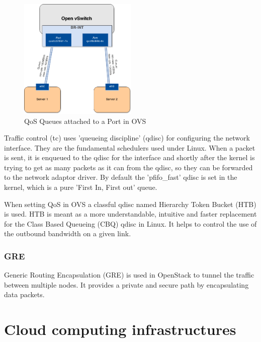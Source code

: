 \begin{figure}[H]
\centering
\includegraphics[width=0.5\textwidth]{images/fundamentals/openvswitch_qos-queues.png}
\caption{QoS Queues attached to a Port in OVS}
\end{figure}


Traffic control (tc) uses 'queueing discipline' (qdisc) for configuring the network interface. They are the fundamental schedulers used under Linux. When a packet is sent, it is enqueued to the qdisc for the interface and shortly after the kernel is trying to get as many packets as it can from the qdisc, so they can be forwarded to the network adaptor driver. By default the 'pfifo\_fast' qdisc is set in the kernel, which is a pure 'First In, First out' queue.

When setting QoS in OVS a classful qdisc named Hierarchy Token Bucket (HTB) is used. HTB is meant as a more understandable, intuitive and faster replacement for the Class Based Queueing (CBQ) qdisc in Linux. It helps to control the use of the outbound bandwidth on a given link. 


\subsubsection{GRE}
Generic Routing Encapsulation (GRE) is used in OpenStack to tunnel the traffic between multiple nodes. It provides a private and secure path by encapsulating data packets.


\section{Cloud computing infrastructures}


